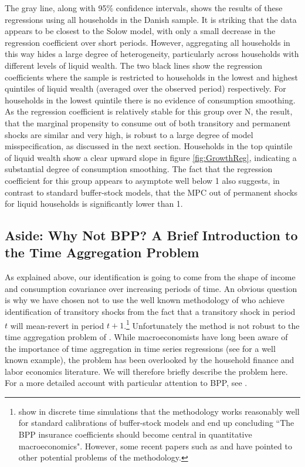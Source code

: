 \documentclass[titlepage]{\econtex}\newcommand{\texname}{ConsumptionHeterogeneity}
\begin{document}
The gray line, along with 95\% confidence intervals, shows the results of these regressions using all households in the Danish sample. It is striking that the data appears to be closest to the Solow model, with only a small decrease in the regression coefficient over short periods. However, aggregating all households in this way hides a large degree of heterogeneity, particularly across households with different levels of liquid wealth. The two black lines show the regression coefficients where the sample is restricted to households in the lowest and highest quintiles of liquid wealth (averaged over the observed period) respectively. For households in the lowest quintile there is no evidence of consumption smoothing. As the regression coefficient is relatively stable for this group over N, the result, that the marginal propensity to consume out of both transitory and permanent shocks are similar and very high, is robust to a large degree of model misspecification, as discussed in the next section. Households in the top quintile of liquid wealth show a clear upward slope in figure \ref{fig:GrowthReg}, indicating a substantial degree of consumption smoothing. The fact that the regression coefficient for this group appears to asymptote well below 1 also suggests, in contrast to standard buffer-stock models, that the MPC out of permanent shocks for liquid households is significantly lower than 1.

\subsection{Aside: Why Not BPP? A Brief Introduction to the Time Aggregation Problem} \label{TimeAgg}
As explained above, our identification is going to come from the shape of income and consumption covariance over increasing periods of time. An obvious question is why we have chosen not to use the well known methodology of \cite{blundell_consumption_2008} who achieve identification of transitory shocks from the fact that a transitory shock in period $t$ will mean-revert in period $t+1$.\footnote{\cite{kaplan_how_2010} show in discrete time simulations that the methodology works reasonably well for standard calibrations of buffer-stock models and end up concluding ``The BPP insurance coefficients should become central in quantitative macroeconomics". However, some recent papers such as \cite{commault_how_2017} and \cite{hryshko_income_2018} have pointed to other potential problems of the methodology.} Unfortunately the method is not robust to the time aggregation problem of \cite{working_note_1960}. While macroeconomists have long been aware of the importance of time aggregation in time series regressions (see \cite{campbell_consumption_1989} for a well known example), the problem has been overlooked by the household finance and labor economics literature. We will therefore briefly describe the problem here. For a more detailed account with particular attention to BPP, see \cite{crawley_time_2018}.
\end{document}
